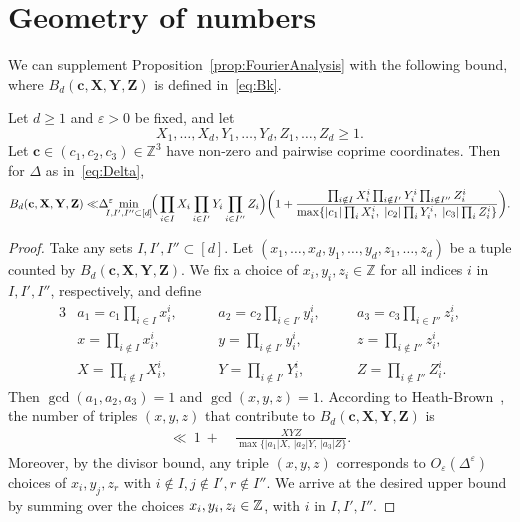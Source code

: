 \section{Geometry of numbers}\label{s:geom}


We can supplement Proposition~\ref{prop:FourierAnalysis} with the following bound,
where $B_d(\mathbf{c},\mathbf{X},\mathbf{Y},\mathbf{Z})$ is defined in~\eqref{eq:Bk}.

\begin{proposition} \label{prop:GeometryofNumbers}
Let $d\geq 1$ and $\varepsilon>0$ be fixed, and let
\[
X_1,\ldots, X_d, Y_1,\ldots, Y_d,Z_1,\ldots, Z_d\geq 1.
\]
Let $\mathbf{c}\in (c_1,c_2,c_3)\in \mathbb{Z}^3$ have non-zero and pairwise coprime coordinates.
Then for $\Delta$ as in~\eqref{eq:Delta},
\[
B_d(\mathbf{c},\mathbf{X},\mathbf{Y},\mathbf{Z})
\ll
\hspace{-0.1cm} \Delta^{\varepsilon}
\hspace{-0.3cm}
\min_{I,I',I''\subset[d]}
\hspace{-0.1cm}
\Big(\prod_{i\in I}X_i\prod_{i\in I'}Y_i\prod_{i\in I''}Z_i\Big)\bigg(1 +
\frac{\prod_{i\notin I}X_i^i\prod_{i\notin I'}Y_i^i\prod_{i\notin I''}Z_i^i}
{\max\{|c_1|\prod_{i}X_i^i,\;|c_2|\prod_{i}Y_i^i,\;|c_3|\prod_{i}Z_i^i\}}\bigg).
\]
\end{proposition}
\begin{proof}
Take any sets $I,I',I''\subset[d]$. Let $(x_1,\ldots, x_d,y_1,\ldots, y_d,z_1,\ldots, z_d)$ be a tuple counted by $B_d(\mathbf{c},\mathbf{X},\mathbf{Y},\mathbf{Z})$. We fix a choice of
$
x_i,y_i,z_i \in \mathbb{Z}
$ for all indices $i$ in $I,I',I''$, respectively, and define
\begin{alignat*}{3}
&a_1=c_1\prod_{i\in I}x_i^i, \quad
&&a_2=c_2\prod_{i\in I'}y_i^i, \quad
&&a_3=c_3\prod_{i\in I''}z_i^i,\\
&x=\prod_{i\notin I}x_i^i, \qquad
&&y=\prod_{i\notin I'}y_i^i, \qquad
&&z=\prod_{i\notin I''}z_i^i,\\
&X=\prod_{i\notin I}X_i^i, \qquad
&&Y=\prod_{i\notin I'}Y_i^i, \qquad
&&Z=\prod_{i\notin I''}Z_i^i.
\end{alignat*}
Then $\gcd(a_1,a_2,a_3)=1$ and $\gcd(x,y,z)=1$. According to Heath-Brown~\cite[Lemma 3]{h-b84}, the number of triples $(x,y,z)$ that contribute to $B_d(\mathbf{c},\mathbf{X},\mathbf{Y},\mathbf{Z})$ is
\begin{align*}
\ll \ 1 \ + \ &
\frac{XYZ}{\max\big\{|a_1|X,\,|a_2|Y,\,|a_3|Z\big\}}.
\end{align*}
Moreover, by the divisor bound, any triple $(x,y,z)$ corresponds to $O_{\varepsilon}(\Delta^{\varepsilon})$ choices of $x_i,y_j,z_r$ with $i\not \in I, j\not \in I', r\not \in I''$.
We arrive at the
desired upper bound by
summing over the choices $x_i,y_i,z_i\in\mathbb{Z}$, with $i$ in $I,I',I''$.
\end{proof}

